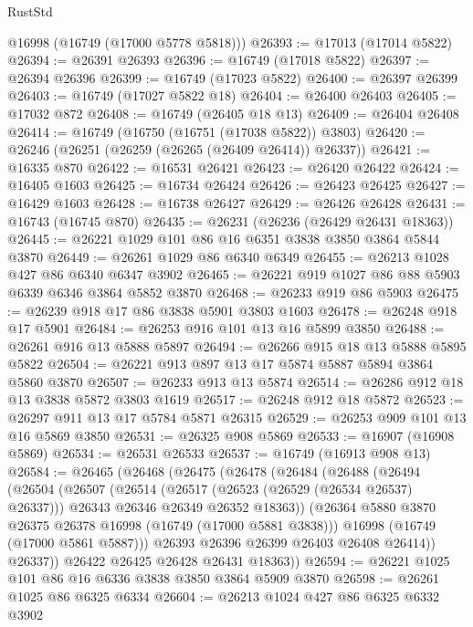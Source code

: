 \begin{lexlean}{RustStd}
\begin{coremodule}
      @16998
      (@16749 (@17000 @5778 @5818)))
@26393 := @17013 (@17014 @5822)
@26394 := @26391 @26393
@26396 := @16749 (@17018 @5822)
@26397 := @26394 @26396
@26399 := @16749 (@17023 @5822)
@26400 := @26397 @26399
@26403 := @16749 (@17027 @5822 @18)
@26404 := @26400 @26403
@26405 := @17032 @872
@26408 := @16749 (@26405 @18 @13)
@26409 := @26404 @26408
@26414 := @16749 (@16750 (@16751 (@17038 @5822)) @3803)
@26420 := @26246 (@26251 (@26259 (@26265 (@26409 @26414)) @26337))
@26421 := @16335 @870
@26422 := @16531 @26421
@26423 := @26420 @26422
@26424 := @16405 @1603
@26425 := @16734 @26424
@26426 := @26423 @26425
@26427 := @16429 @1603
@26428 := @16738 @26427
@26429 := @26426 @26428
@26431 := @16743 (@16745 @870)
@26435 := @26231 (@26236 (@26429 @26431 @18363))
@26445 := @26221 @1029 @101 @86 @16 @6351 @3838 @3850 @3864 @5844 @3870
@26449 := @26261 @1029 @86 @6340 @6349
@26455 := @26213 @1028 @427 @86 @6340 @6347 @3902
@26465 := @26221 @919 @1027 @86 @88 @5903 @6339 @6346 @3864 @5852 @3870
@26468 := @26233 @919 @86 @5903
@26475 := @26239 @918 @17 @86 @3838 @5901 @3803 @1603
@26478 := @26248 @918 @17 @5901
@26484 := @26253 @916 @101 @13 @16 @5899 @3850
@26488 := @26261 @916 @13 @5888 @5897
@26494 := @26266 @915 @18 @13 @5888 @5895 @5822
@26504 := @26221 @913 @897 @13 @17 @5874 @5887 @5894 @3864 @5860 @3870
@26507 := @26233 @913 @13 @5874
@26514 := @26286 @912 @18 @13 @3838 @5872 @3803 @1619
@26517 := @26248 @912 @18 @5872
@26523 := @26297 @911 @13 @17 @5784 @5871 @26315
@26529 := @26253 @909 @101 @13 @16 @5869 @3850
@26531 := @26325 @908 @5869
@26533 := @16907 (@16908 @5869)
@26534 := @26531 @26533
@26537 := @16749 (@16913 @908 @13)
@26584 := @26465
    (@26468
      (@26475
        (@26478
          (@26484
            (@26488
              (@26494
                (@26504
                  (@26507
                    (@26514
                      (@26517 (@26523 (@26529 (@26534 @26537) @26337)))
                      @26343
                      @26346
                      @26349
                      @26352
                      @18363))
                  (@26364 @5880 @3870 @26375 @26378 @16998 (@16749 (@17000 @5881 @3838)))
                  @16998
                  (@16749 (@17000 @5861 @5887)))
                @26393
                @26396
                @26399
                @26403
                @26408
                @26414))
            @26337))
        @26422
        @26425
        @26428
        @26431
        @18363))
@26594 := @26221 @1025 @101 @86 @16 @6336 @3838 @3850 @3864 @5909 @3870
@26598 := @26261 @1025 @86 @6325 @6334
@26604 := @26213 @1024 @427 @86 @6325 @6332 @3902

\end{coremodule}
\end{lexlean}
